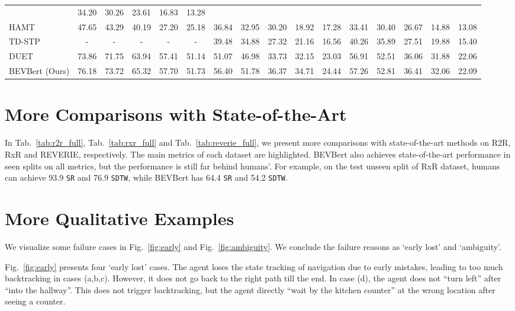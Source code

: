 \begin{table*}[h]
{\begin{tabular}{l ccccc | ccccc | ccccc }
& 34.20 & 30.26 & 23.61 & 16.83 & 13.28 \\
HAMT~\cite{chen2021history} 
& 47.65 & 43.29 & 40.19 & 27.20 & 25.18
& 36.84 & 32.95 & 30.20 & 18.92 & 17.28 
& 33.41 & 30.40 & 26.67 & 14.88 & 13.08 \\ 
TD-STP~\cite{zhao2022target} 
& - & - & - & - & -
& 39.48 & 34.88 & 27.32 & 21.16 & 16.56 
& 40.26 & 35.89 & 27.51 & 19.88 & 15.40 \\ 
DUET~\cite{chen2022think} 
& 73.86 & 71.75 & 63.94 & 57.41 & 51.14
& 51.07 & 46.98 & 33.73 & 32.15 & 23.03 
& 56.91 & 52.51 & 36.06 & 31.88 & 22.06 \\
BEVBert (Ours) 
& \color{blue}76.18 & \color{blue}73.72 & \color{blue}65.32 & \color{blue}57.70 & \color{blue}51.73
& \color{blue}56.40 & \color{blue}51.78 & \color{blue}36.37 & \color{blue}34.71 & \color{blue}24.44 
& \color{blue}57.26 & \color{blue}52.81 & \color{blue}36.41 & \color{blue}32.06 & \color{blue}22.09 \\
\bottomrule
\end{tabular}}
\vspace{-2.5mm}
\caption{Comparison with state-of-the-art methods on REVERIE dataset.}\label{tab:reverie_full}
\end{table*}
\section{More Comparisons with State-of-the-Art}\label{sec:sup_sota}
In Tab.~\ref{tab:r2r_full}, Tab.~\ref{tab:rxr_full} and Tab.~\ref{tab:reverie_full}, we present more comparisons with state-of-the-art methods on R2R, RxR and REVERIE, respectively. The main metrics of each dataset are highlighted. 
BEVBert also achieves state-of-the-art performance in seen splits on all metrics, but the performance is still far behind humans'.
For example, on the test unseen split of RxR dataset, humans can achieve 93.9 \texttt{SR} and 76.9 \texttt{SDTW}, while BEVBert has 64.4 \texttt{SR} and 54.2 \texttt{SDTW}.





\section{More Qualitative Examples}\label{sec:sup_viz}
We visualize some failure cases in Fig.~\ref{fig:early} and Fig.~\ref{fig:ambiguity}. We conclude the failure reasons as `early lost' and `ambiguity'.

Fig.~\ref{fig:early} presents four `early lost' cases. 
The agent loses the state tracking of navigation due to early mistakes, leading to too much backtracking in cases (a,b,c). 
However, it does not go back to the right path till the end. 
In case (d), the agent does not ``turn left'' after ``into the hallway''. This does not trigger backtracking, but the agent directly ``wait by the kitchen counter'' at the wrong location after seeing a counter.

